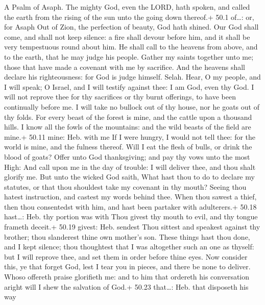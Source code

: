 A Psalm of Asaph.  The mighty God, even the LORD, hath
spoken, and called the earth from the rising of the sun unto the going
down thereof.+ 50.1 of\ldots: or, for Asaph  Out of Zion,
the perfection of beauty, God hath shined.  Our God shall
come, and shall not keep silence: a fire shall devour before him, and it
shall be very tempestuous round about him.  He shall call to
the heavens from above, and to the earth, that he may judge his people.
 Gather my saints together unto me; those that have made a
covenant with me by sacrifice.  And the heavens shall
declare his righteousness: for God is judge himself. Selah. 
Hear, O my people, and I will speak; O Israel, and I will testify
against thee: I am God, even thy God.  I will not reprove
thee for thy sacrifices or thy burnt offerings, to have been continually
before me.  I will take no bullock out of thy house, nor he
goats out of thy folds.  For every beast of the forest is
mine, and the cattle upon a thousand hills.  I know all the
fowls of the mountains: and the wild beasts of the field are mine.+
50.11 mine: Heb. with me  If I were hungry, I would not
tell thee: for the world is mine, and the fulness thereof. 
Will I eat the flesh of bulls, or drink the blood of goats?
 Offer unto God thanksgiving; and pay thy vows unto the
most High:  And call upon me in the day of trouble: I will
deliver thee, and thou shalt glorify me.  But unto the
wicked God saith, What hast thou to do to declare my statutes, or that
thou shouldest take my covenant in thy mouth?  Seeing thou
hatest instruction, and castest my words behind thee.  When
thou sawest a thief, then thou consentedst with him, and hast been
partaker with adulterers.+ 50.18 hast\ldots: Heb. thy portion was with
 Thou givest thy mouth to evil, and thy tongue frameth
deceit.+ 50.19 givest: Heb. sendest  Thou sittest and
speakest against thy brother; thou slanderest thine own mother's son.
 These things hast thou done, and I kept silence; thou
thoughtest that I was altogether such an one as thyself: but I will
reprove thee, and set them in order before thine eyes.  Now
consider this, ye that forget God, lest I tear you in pieces, and there
be none to deliver.  Whoso offereth praise glorifieth me:
and to him that ordereth his conversation aright will I shew the
salvation of God.+ 50.23 that\ldots: Heb. that disposeth his way

